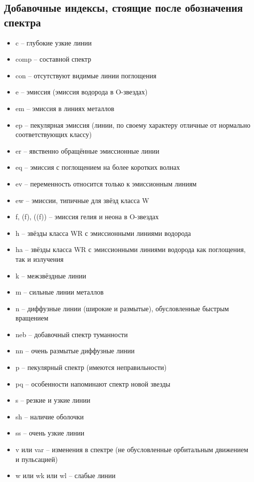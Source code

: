 \documentclass[12pt,a4paper]{article}
\begin{document}
\subsection{Добавочные индексы, стоящие после обозначения спектра}
\begin{itemize}
\item c -- глубокие узкие линии
\item comp -- составной спектр
\item con -- отсутствуют видимые линии поглощения
\item e -- эмиссия (эмиссия водорода в O-звездах)
\item em -- эмиссия в линиях металлов
\item ep -- пекулярная эмиссия (линии, по своему характеру отличные от нормально соответствующих классу)
\item er -- явственно обращённые эмиссионные линии
\item eq -- эмиссия с поглощением на более коротких волнах
\item ev -- переменность относится только к эмиссионным линиям
\item ew -- эмиссии, типичные для звёзд класса W
\item f, (f), ((f)) -- эмиссия гелия и неона в O-звездах
\item h -- звёзды класса WR с эмиссионными линиями водорода
\item ha -- звёзды класса WR с эмиссионными линиями водорода как поглощения, так и излучения
\item k -- межзвёздные линии
\item m -- сильные линии металлов
\item n -- диффузные линии (широкие и размытые), обусловленные быстрым вращением
\item neb -- добавочный спектр туманности
\item nn -- очень размытые диффузные линии
\item p -- пекулярный спектр (имеются неправильности)
\item pq -- особенности напоминают спектр новой звезды
\item s -- резкие и узкие линии
\item sh -- наличие оболочки
\item ss -- очень узкие линии
\item v или var -- изменения в спектре (не обусловленные орбитальным движением и пульсацией)
\item w или wk или wl -- слабые линии
\end{itemize}
\end{document}
